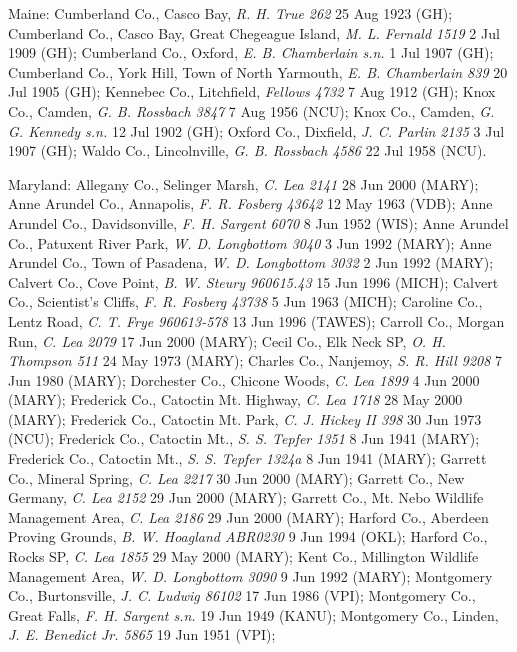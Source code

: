 \documentclass{article}
\begin{document}
Maine:
Cumberland Co., Casco Bay, \textit{R. H. True 262} 25 Aug 1923 (GH);
Cumberland Co., Casco Bay, Great Chegeague Island, \textit{M. L. Fernald 1519} 2 Jul 1909 (GH);
Cumberland Co., Oxford, \textit{E. B. Chamberlain s.n.} 1 Jul 1907 (GH);
Cumberland Co., York Hill, Town of North Yarmouth, \textit{E. B. Chamberlain 839} 20 Jul 1905 (GH);
Kennebec Co., Litchfield, \textit{Fellows 4732} 7 Aug 1912 (GH);
Knox Co., Camden, \textit{G. B. Rossbach 3847} 7 Aug 1956 (NCU);
Knox Co., Camden, \textit{G. G. Kennedy s.n.} 12 Jul 1902 (GH);
Oxford Co., Dixfield, \textit{J. C. Parlin 2135} 3 Jul 1907 (GH);
Waldo Co., Lincolnville, \textit{G. B. Rossbach 4586} 22 Jul 1958 (NCU).

Maryland:
Allegany Co., Selinger Marsh, \textit{C. Lea 2141} 28 Jun 2000 (MARY);
Anne Arundel Co., Annapolis, \textit{F. R. Fosberg 43642} 12 May 1963 (VDB);
Anne Arundel Co., Davidsonville, \textit{F. H. Sargent 6070} 8 Jun 1952 (WIS);
Anne Arundel Co., Patuxent River Park, \textit{W. D. Longbottom 3040} 3 Jun 1992 (MARY);
Anne Arundel Co., Town of Pasadena, \textit{W. D. Longbottom 3032} 2 Jun 1992 (MARY);
Calvert Co., Cove Point, \textit{B. W. Steury 960615.43} 15 Jun 1996 (MICH);
Calvert Co., Scientist's Cliffs, \textit{F. R. Fosberg 43738} 5 Jun 1963 (MICH);
Caroline Co., Lentz Road, \textit{C. T. Frye 960613-578} 13 Jun 1996 (TAWES);
Carroll Co., Morgan Run, \textit{C. Lea 2079} 17 Jun 2000 (MARY);
Cecil Co., Elk Neck SP, \textit{O. H. Thompson 511} 24 May 1973 (MARY);
Charles Co., Nanjemoy, \textit{S. R. Hill 9208} 7 Jun 1980 (MARY);
Dorchester Co., Chicone Woods, \textit{C. Lea 1899} 4 Jun 2000 (MARY);
Frederick Co., Catoctin Mt. Highway, \textit{C. Lea 1718} 28 May 2000 (MARY);
Frederick Co., Catoctin Mt. Park, \textit{C. J. Hickey II 398} 30 Jun 1973 (NCU);
Frederick Co., Catoctin Mt., \textit{S. S. Tepfer 1351} 8 Jun 1941 (MARY);
Frederick Co., Catoctin Mt., \textit{S. S. Tepfer 1324a} 8 Jun 1941 (MARY);
Garrett Co., Mineral Spring, \textit{C. Lea 2217} 30 Jun 2000 (MARY);
Garrett Co., New Germany, \textit{C. Lea 2152} 29 Jun 2000 (MARY);
Garrett Co., Mt. Nebo Wildlife Management Area, \textit{C. Lea 2186} 29 Jun 2000 (MARY);
Harford Co., Aberdeen Proving Grounds, \textit{B. W. Hoagland ABR0230} 9 Jun 1994 (OKL);
Harford Co., Rocks SP, \textit{C. Lea 1855} 29 May 2000 (MARY);
Kent Co., Millington Wildlife Management Area, \textit{W. D. Longbottom 3090} 9 Jun 1992 (MARY);
Montgomery Co., Burtonsville, \textit{J. C. Ludwig 86102} 17 Jun 1986 (VPI);
Montgomery Co., Great Falls, \textit{F. H. Sargent s.n.} 19 Jun 1949 (KANU);
Montgomery Co., Linden, \textit{J. E. Benedict Jr. 5865} 19 Jun 1951 (VPI);
\end{document}
